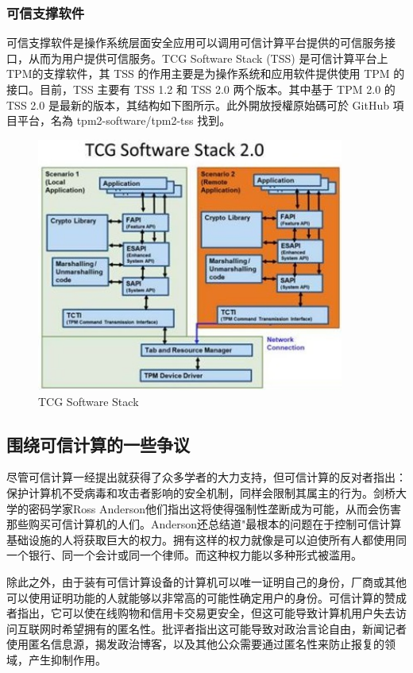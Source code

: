 \subsubsection{可信支撑软件}

可信支撑软件是操作系统层面安全应用可以调用可信计算平台提供的可信服务接口，从而为用户提供可信服务。TCG Software Stack (TSS) 是可信计算平台上TPM的支撑软件，其 TSS 的作用主要是为操作系统和应用软件提供使用 TPM 的接口。目前，TSS 主要有 TSS 1.2 和 TSS 2.0 两个版本。其中基于 TPM 2.0 的 TSS 2.0 是最新的版本，其结构如下图所示。此外開放授權原始碼可於 GitHub 項目平台，名為 tpm2-software/tpm2-tss 找到。

\begin{figure}[htb]
\centering 
\includegraphics[width=0.90\textwidth]{img/ch3m3.jpg} 
\caption{TCG Software Stack}
\label{Test}
\end{figure}


\subsection{围绕可信计算的一些争议}

尽管可信计算一经提出就获得了众多学者的大力支持，但可信计算的反对者指出：保护计算机不受病毒和攻击者影响的安全机制，同样会限制其属主的行为。剑桥大学的密码学家Ross Anderson他们指出这将使得强制性垄断成为可能，从而会伤害那些购买可信计算机的人们。Anderson还总结道"最根本的问题在于控制可信计算基础设施的人将获取巨大的权力。拥有这样的权力就像是可以迫使所有人都使用同一个银行、同一个会计或同一个律师。而这种权力能以多种形式被滥用。

除此之外，由于装有可信计算设备的计算机可以唯一证明自己的身份，厂商或其他可以使用证明功能的人就能够以非常高的可能性确定用户的身份。可信计算的赞成者指出，它可以使在线购物和信用卡交易更安全，但这可能导致计算机用户失去访问互联网时希望拥有的匿名性。批评者指出这可能导致对政治言论自由，新闻记者使用匿名信息源，揭发政治博客，以及其他公众需要通过匿名性来防止报复的领域，产生抑制作用。

